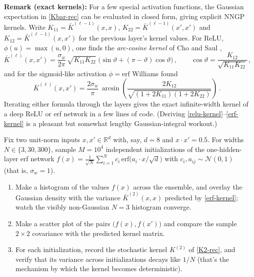 \documentclass[11pt]{article}
\newcommand{\R}{\mathbb{R}}
\newcommand{\CN}{{\mathcal N}}
\begin{document}
\smallskip
\noindent\textbf{Remark (exact kernels):} For a few special activation functions, the Gaussian expectation in \eqref{Kbar-rec} can be evaluated in closed form, giving explicit NNGP kernels. Write $K_{11}=\bar K^{(\ell-1)}(x,x)$, $K_{22}=\bar K^{(\ell-1)}(x',x')$ and $K_{12}=\bar K^{(\ell-1)}(x,x')$ for the previous layer's kernel values. For ReLU, $\phi(u)=\max(u,0)$, one finds the \emph{arc-cosine kernel} of Cho and Saul \cite{cho2009kernel},
%
\begin{equation} \label{relu-kernel}
    \bar K^{(\ell)}(x,x') = \frac{\sigma_w}{2\pi}\,\sqrt{K_{11}K_{22}}\;\Big(\sin\vartheta + (\pi - \vartheta)\cos\vartheta\Big)\,,
    \qquad
    \cos\vartheta = \frac{K_{12}}{\sqrt{K_{11}K_{22}}}\,,
\end{equation}
%
and for the sigmoid-like activation $\phi = \mathrm{erf}$ Williams \cite{williams1997computing} found
%
\begin{equation} \label{erf-kernel}
    \bar K^{(\ell)}(x,x') = \frac{2\sigma_w}{\pi}\, \arcsin\!\left(\frac{2K_{12}}{\sqrt{(1+2K_{11})(1+2K_{22})}}\right)\,.
\end{equation}
%
Iterating either formula through the layers gives the exact infinite-width kernel of a deep ReLU or erf network in a few lines of code. (Deriving \eqref{relu-kernel}--\eqref{erf-kernel} is a pleasant but somewhat lengthy Gaussian-integral workout.)

\begin{exercise}
\label{ex:nngp-lab}
Fix two unit-norm inputs $x, x'\in\R^d$ with, say, $d=8$ and $x\cdot x' = 0.5$. For widths $N \in \{3, 30, 300\}$, sample $M = 10^4$ independent initializations of the one-hidden-layer erf network $f(x) = \frac{1}{\sqrt N}\sum_{i=1}^N c_i\, \mathrm{erf}\big(a_i\cdot x/\sqrt d\big)$ with $c_i, a_{ij}\sim\CN(0,1)$ (that is, $\sigma_w = 1$).
\begin{enumerate}
  \item Make a histogram of the values $f(x)$ across the ensemble, and overlay the Gaussian density with the variance $\bar K^{(2)}(x,x)$ predicted by \eqref{erf-kernel}; watch the visibly non-Gaussian $N=3$ histogram converge.
  \item Make a scatter plot of the pairs $\big(f(x), f(x')\big)$ and compare the sample $2\times2$ covariance with the predicted kernel matrix.
  \item For each initialization, record the stochastic kernel $K^{(2)}$ of \eqref{K2-rec}, and verify that its variance across initializations decays like $1/N$ (that's the mechanism by which the kernel becomes deterministic).
\end{enumerate}
\end{exercise}
\end{document}
